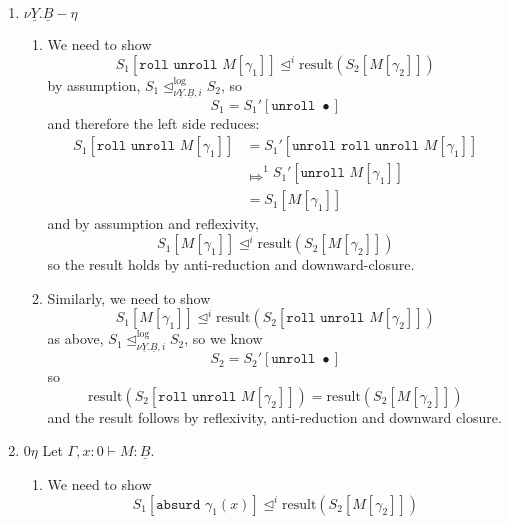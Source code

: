 \documentclass[acmsmall,nonacm]{acmart}
\renewcommand{\u}{\underline}
\newcommand{\apreorder}{\trianglelefteq}
\newcommand{\ix}[2]{\mathrel{#1^{#2}}}
\newcommand{\itylrof}[3]{\ilrof{#1}{#3,#2}}
\newcommand{\ilrof}[2]{\mathrel{{#1}^{\text{log}}_{#2}}}
\newcommand{\itylr}[2]{\itylrof{\apreorder}{#1}{#2}}
\newcommand{\bigstepsin}[1]{\mathrel{\Mapsto^{#1}}}
\newcommand{\roll}{\kw{roll}}
\newcommand{\rollty}[1]{\texttt{roll}_{#1}\,\,}
\newcommand{\unroll}{\kw{unroll}}
\newcommand{\result}{\text{result}}
\newcommand{\kw}[1]{\texttt{#1}\,\,}
\newcommand{\absurd}{\kw{absurd}}
\begin{document}
{\begin{longproof}
\begin{enumerate}
\begin{enumerate}
      \[ S_1[\unroll \rollty{\nu \u Y. \u B} M[\gamma_1]] \ix\apreorder i
      \result(S_2[M[\gamma_2]]) \]
      By the operational semantics,
      \[ S_1[\unroll \rollty{\nu \u Y. \u B} M[\gamma_1]] \bigstepsin{1} S_1[M[\gamma_1]] \]
      and by reflexivity and assumptions
      \[ S_1[M[\gamma_1]] \ix\apreorder {i} S_2[M[\gamma_2]] \]
      so the result follows by anti-reduction and downward closure.
    \item We need to show
      \[ S_1[M[\gamma_1]] \ix\apreorder i \result(S_2[\unroll \rollty{\nu \u Y. \u B} M[\gamma_2]]) \]
      By the operational semantics and invariance of result under reduction this is equivalent to
      \[ S_1[M[\gamma_1]] \ix\apreorder i \result(S_2[M[\gamma_2]]) \]
      which follows by assumption.
    \end{enumerate}
  \item $\nu \u Y. \u B-\eta$
    \begin{enumerate}
    \item We need to show
      \[ S_1[\roll \unroll M[\gamma_1]] \ix\apreorder i \result(S_2[M[\gamma_2]]) \]
      by assumption, $S_1 \itylr i {\nu \u Y.\u B} S_2$, so
      \[ S_1 = S_1'[\unroll \bullet] \]
      and therefore the left side reduces:
      \begin{align*}
         S_1[\roll \unroll M[\gamma_1]]
         &= S_1'[\unroll\roll\unroll M[\gamma_1]]\\
         &\bigstepsin{1} S_1'[\unroll M[\gamma_1]]\\
         &= S_1[M[\gamma_1]]
      \end{align*}
      and by assumption and reflexivity,
      \[ S_1[M[\gamma_1]] \ix\apreorder i \result(S_2[M[\gamma_2]]) \]
      so the result holds by anti-reduction and downward-closure.
    \item Similarly, we need to show
      \[ S_1[M[\gamma_1]] \ix\apreorder i \result(S_2[\roll\unroll M[\gamma_2]])\]
      as above, $S_1 \itylr i {\nu \u Y.\u B} S_2$, so we know
      \[ S_2 = S_2'[\unroll\bullet] \]
      so
      \[ \result(S_2[\roll\unroll M[\gamma_2]]) = \result(S_2[M[\gamma_2]])\]
      and the result follows by reflexivity, anti-reduction and downward closure.
    \end{enumerate}
  \item $0\eta$ Let $\Gamma, x : 0 \vdash M : \u B$.
    \begin{enumerate}
    \item We need to show
      \[ S_1[\absurd \gamma_1(x)] \ix\apreorder i \result(S_2[M[\gamma_2]])\]

\end{enumerate}
\end{enumerate}
\end{longproof}}
\end{document}
